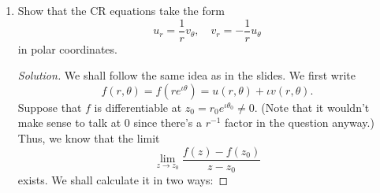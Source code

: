 \documentclass[12pt]{article}
\theoremstyle{definition}
\numberwithin{thm}{section}
\newenvironment{soln}{\begin{proof}[Solution]}{\end{proof}}
\begin{document}
\begin{enumerate}
\begin{soln}
\begin{enumerate}
			\item Real differentiable everywhere. Complex differentiable nowhere. Use CR equations again.
			\item 
			$f$ is real differentiable precisely on $\mathbb{R}^2\setminus\{(0, 0)\}.$\\
			However, it is not complex differentiable anywhere.\\~\\
			Breaking as earlier, we get
			\begin{equation*} 
				u(x, y) = \dfrac{x^2 - y^2}{x^2 + y^2}, \quad v(x, y) = \dfrac{2xy}{x^2 + y^2},
			\end{equation*}
			for $(x, y) \in \mathbb{R}^2\setminus\{(0, 0)\}$ and
			\begin{equation*} 
				u(0, 0) = 0 = v(0, 0).
			\end{equation*}
			Note that $u$ and $v$ aren't even continuous at $(0, 0).$ Thus, neither if $f.$ Hence, $f$ is neither real nor complex differentiable at $(0, 0).$ \\
			However, at all other points, all partial derivatives exist and are continuous. Thus, $f$ is real differentiable at all those points. However, computing $u_x, u_y, v_x, v_y$ explicitly shows that the CR equations are not satisfied anywhere. Thus, $f$ is not complex differentiable anywhere. \qedhere
		\end{enumerate}
	\end{soln}
	\item  Show that the CR equations take the form
	\begin{equation*} 
		u_r = \dfrac{1}{r}v_\theta, \quad v_r = -\dfrac{1}{r}u_\theta
	\end{equation*}
	in polar coordinates.
	\begin{soln}
		We shall follow the same idea as in the slides. We first write
		\begin{equation*} 
			f(r, \theta) = f(re^{\iota\theta}) = u(r, \theta) + \iota v(r, \theta).
		\end{equation*}
		Suppose that $f$ is differentiable at $z_0 = r_0e^{\iota\theta_0} \neq 0.$ (Note that it wouldn't make sense to talk at $0$ since there's a $r^{-1}$ factor in the question anyway.)\\
		Thus, we know that the limit
		\begin{equation*} 
			\lim_{z\to z_0}\dfrac{f(z) - f(z_0)}{z - z_0}
		\end{equation*}
		exists. We shall calculate it in two ways:

\end{soln}
\end{enumerate}
\end{document}
